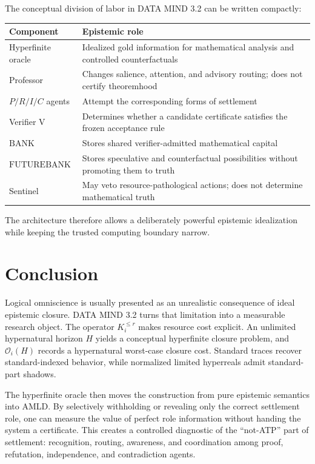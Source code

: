 \documentclass[11pt]{article}
\newcommand{\BANK}{\mathrm{BANK}}
\newcommand{\FBANK}{\mathrm{FUTUREBANK}}
\newcommand{\V}{\mathrm{V}}
\newcommand{\Ocal}{\mathcal{O}}
\begin{document}
The conceptual division of labor in DATA MIND 3.2 can be written compactly:
\begin{center}
\begin{tabular}{p{}p{}}
\toprule
Component & Epistemic role\\
\midrule
Hyperfinite oracle & Idealized gold information for mathematical analysis and controlled counterfactuals\\
Professor & Changes salience, attention, and advisory routing; does not certify theoremhood\\
$P/R/I/C$ agents & Attempt the corresponding forms of settlement\\
Verifier $\V$ & Determines whether a candidate certificate satisfies the frozen acceptance rule\\
$\BANK$ & Stores shared verifier-admitted mathematical capital\\
$\FBANK$ & Stores speculative and counterfactual possibilities without promoting them to truth\\
Sentinel & May veto resource-pathological actions; does not determine mathematical truth\\
\bottomrule
\end{tabular}
\end{center}

The architecture therefore allows a deliberately powerful epistemic idealization while keeping the trusted computing boundary narrow.

\section{Conclusion}

Logical omniscience is usually presented as an unrealistic consequence of ideal epistemic closure. DATA MIND 3.2 turns that limitation into a measurable research object. The operator $K_i^{\le r}$ makes resource cost explicit. An unlimited hypernatural horizon $H$ yields a conceptual hyperfinite closure problem, and $\Ocal_i(H)$ records a hypernatural worst-case closure cost. Standard traces recover standard-indexed behavior, while normalized limited hyperreals admit standard-part shadows.

The hyperfinite oracle then moves the construction from pure epistemic semantics into AMLD. By selectively withholding or revealing only the correct settlement role, one can measure the value of perfect role information without handing the system a certificate. This creates a controlled diagnostic of the ``not-ATP'' part of settlement: recognition, routing, awareness, and coordination among proof, refutation, independence, and contradiction agents.
\end{document}
